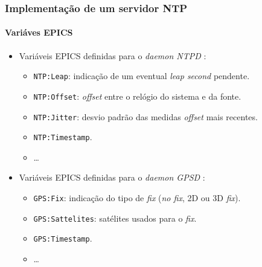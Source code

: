 
\begin{frame}

\frametitle{Implementação de um servidor NTP}
\framesubtitle{Variáves EPICS}

\begin{itemize}
  \item Variáveis EPICS definidas para o \textit{daemon NTPD} :

	\begin{itemize}
	\item  \texttt{NTP:Leap}: indicação de um eventual
	\textit{leap second} pendente.
	\item \texttt{NTP:Offset}: \textit{offset} entre o
	relógio do sistema e da fonte.
	\item \texttt{NTP:Jitter}: desvio padrão das medidas
	\textit{offset} mais recentes.
	\item \texttt{NTP:Timestamp}.
	\item \ldots
	\end{itemize}
  \item Variáveis EPICS definidas para o \textit{daemon GPSD} :
  
	\begin{itemize}
	\item \texttt{GPS:Fix}: indicação do tipo de
	\textit{fix} (\textit{no fix}, 2D ou 3D \textit{fix}).
	\item \texttt{GPS:Sattelites}: satélites usados para o \textit{fix}.
	\item \texttt{GPS:Timestamp}.
	\item \ldots
	\end{itemize}
\end{itemize}
\end{frame}

